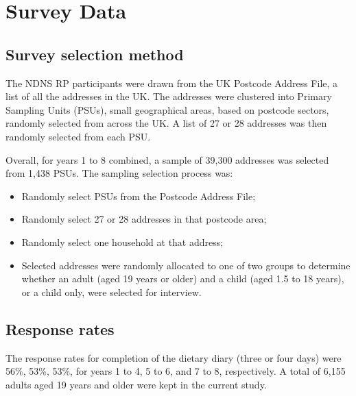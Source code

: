 
\section{Survey Data}\vspace{-0.3cm}

\subsection{Survey selection method}\vspace{-0.3cm}

The NDNS RP participants were drawn from the UK Postcode Address File, a list of all the addresses in the UK. The addresses were clustered into Primary Sampling Units (PSUs), small geographical areas, based on postcode sectors, randomly selected from across the UK. A list of 27 or 28 addresses was then randomly selected from each PSU.

Overall, for years 1 to 8 combined, a sample of 39,300 addresses was selected from 1,438 PSUs. The sampling selection process was: 

\begin{itemize}
	\item Randomly select PSUs from the Postcode Address File; 
	\item Randomly select 27 or 28 addresses in that postcode area; 
	\item Randomly select one household at that address; 
	\item Selected addresses were randomly allocated to one of two groups to determine whether an adult (aged 19 years or older) and a child (aged 1.5 to 18 years), or a child only, were selected for interview.
\end{itemize}
\vspace{-0.6cm}
\subsection{Response rates}\vspace{-0.3cm}

The response rates for completion of the dietary diary (three or four days) were 56\%, 53\%, 53\%, for years 1 to 4, 5 to 6, and 7 to 8, respectively. A total of 6,155 adults aged 19 years and older were kept in the current study. 
\vspace{-0.6cm}

